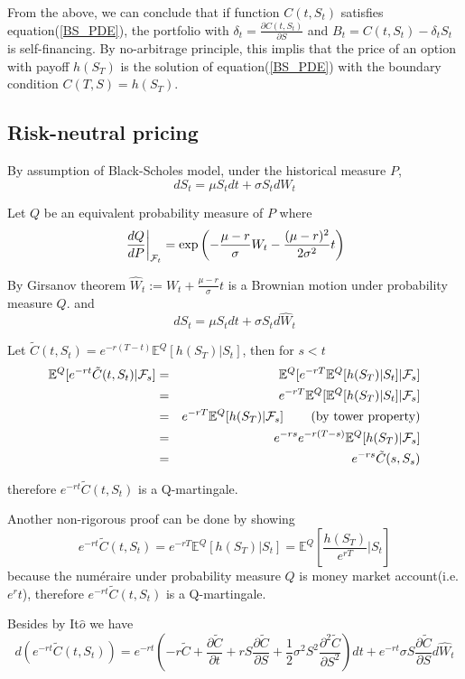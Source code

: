 \documentclass[10pt]{article}
\theoremstyle{plain}
\numberwithin{equation}{section}
\numberwithin{table}{section}
\newcommand{\s}{\sigma}
\newcommand{\prt}[1]{\left( #1 \right)}  %
\newcommand{\de}{\delta}
\newcommand{\pa}{\partial}
\newcommand{\E}{\mathbb{E}}
\begin{document}
From the above, we can conclude that if function $C(t,S_t)$ satisfies equation(\ref{BS_PDE}), the portfolio with $\de_t=\frac{\pa C(t,S_t)}{\pa S}$ and $B_t=C(t,S_t)-\de_t S_t$ is self-financing.
By no-arbitrage principle, this implis that the price of an option with payoff $h(S_T)$ is the solution of equation(\ref{BS_PDE}) with the boundary condition $C(T,S)=h(S_T)$.


\subsection{Risk-neutral pricing}

By assumption of Black-Scholes model, under the historical measure $P$, 
\[
    d S_t = \mu S_t dt+\s S_t d W_t    
\]

Let $Q$ be an equivalent probability measure of $P$ where 
\[
    \left.\frac{dQ}{dP}\right|_{{\cal F}_t} = 
    \exp\prt{-\frac{\mu - r}{\s} W_t - \frac{(\mu-r)^2}{2\s^2}t}
\]

By Girsanov theorem $\widehat{W}_t := W_t + \frac{\mu - r}{\s} t$ is a Brownian motion under probability measure $Q$.
and 
\[
    d S_t = \mu S_t dt+\s S_t d \widehat{W}_t    
\]

Let $\tilde{C}(t, S_t)=e^{-r(T-t)} \E^Q [h(S_T) \vert S_t ] $, then for $s<t$
\begin{eqnarray*}
    \E^Q [e^{-rt} \tilde{C}(t,S_t) \vert {\cal{F}}_s ] &=&  \E^Q [e^{-rT}  \E^Q [h(S_T) \vert S_t ] \vert {\cal{F}}_s ]  \\
    &=& e^{-rT} \E^Q [\E^Q [h(S_T) \vert S_t ] \vert {\cal{F}}_s ] \\
    &=& e^{-rT} \E^Q [h(S_T) \vert {\cal{F}}_s ]  \qquad  \prt{\textrm{by tower property}}\\
    &=& e^{-rs} e^{-r(T-s)}\E^Q [h(S_T) \vert {\cal{F}}_s ] \\
    &=& e^{-rs}\tilde C(s,S_s)
\end{eqnarray*}

therefore $e^{-rt} \tilde{C}(t,S_t)$ is a Q-martingale.

Another non-rigorous proof can be done by showing
\[
    e^{-rt} \tilde{C}(t,S_t) = e^{-rT}  \E^Q [h(S_T) \vert S_t ]  = \E^Q [\frac{h(S_T)}{e^{rT}} \vert S_t ]
\]
because the num\'eraire under probability measure $Q$ is money market account(i.e. $e^rt$), therefore $e^{-rt} \tilde{C}(t,S_t)$ is a Q-martingale.

Besides by It$\hat{o}$ we have 
\[
    d(e^{-rt}\tilde C(t,S_t)) = e^{-rt} \prt{-r \tilde C+\frac{\pa \tilde C}{\pa t}+rS\frac{\pa \tilde C}{\pa S}+\frac{1}{2}\s^2 S^2 \frac{\pa^2 \tilde C}{\pa S^2}}dt + e^{-rt} \s S\frac{\pa \tilde C}{\pa S} d \widehat{W}_t
\]
\end{document}
